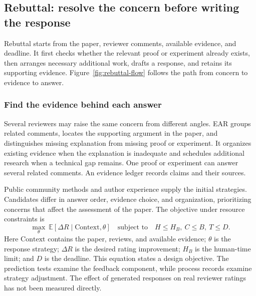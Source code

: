\FloatBarrier
\subsection{Rebuttal: resolve the concern before writing the response}
\label{sec:rebuttal}
Rebuttal starts from the paper, reviewer comments, available evidence, and deadline. It first checks whether the relevant proof or experiment already exists, then arranges necessary additional work, drafts a response, and retains its supporting evidence. Figure~\ref{fig:rebuttal-flow} follows the path from concern to evidence to answer.


\subsubsection{Find the evidence behind each answer}
Several reviewers may raise the same concern from different angles. EAR groups related comments, locates the supporting argument in the paper, and distinguishes missing explanation from missing proof or experiment. It organizes existing evidence when the explanation is inadequate and schedules additional research when a technical gap remains. One proof or experiment can answer several related comments. An evidence ledger records claims and their sources.

Public community methods and author experience supply the initial strategies. Candidates differ in answer order, evidence choice, and organization, prioritizing concerns that affect the assessment of the paper. The objective under resource constraints is
\begin{equation}
\max_{\theta}\ \mathbb E[\Delta R\mid\mathrm{Context},\theta]
\quad\text{subject to}\quad H\le H_B,\ C\le B,\ T\le D.
\label{eq:rebuttal-objective}
\end{equation}
Here $\mathrm{Context}$ contains the paper, reviews, and available evidence; $\theta$ is the response strategy; $\Delta R$ is the desired rating improvement; $H_B$ is the human-time limit; and $D$ is the deadline. This equation states a design objective. The prediction tests examine the feedback component, while process records examine strategy adjustment. The effect of generated responses on real reviewer ratings has not been measured directly.

